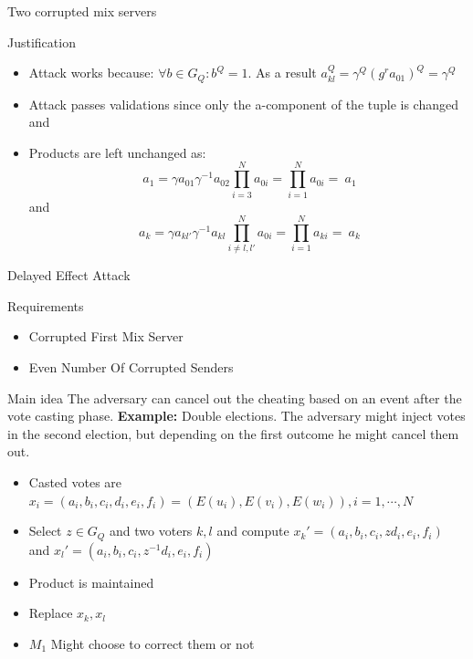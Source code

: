 \documentclass{beamer}
\begin{document}
\begin{frame}[allowframebreaks]{Two corrupted mix servers}
\begin{block}{Justification}
\begin{itemize}
\item Attack works because: $\forall b \in G_Q : b^Q = 1$. As a result $a_{kl}^Q = \gamma ^ Q (g^r a_{01})^Q = \gamma ^ Q$
\item Attack passes validations since only the a-component of the tuple is changed and  
\item Products are left unchanged as:
\[ \ a_{1}  = \gamma a_{01} \gamma^{-1} a_{02} \prod_{i=3}^N a_{0i} = \prod_{i=1}^N a_{0i} = \ a_{1} \] and
\[ \ a_{k}  = \gamma a_{kl'} \gamma^{-1} a_{kl} \prod_{i \neq l,l'}^N a_{0i} = \prod_{i=1}^N a_{ki} = \ a_{k} \]
\end{itemize}
\end{block}

\end{frame}

\begin{frame}[allowframebreaks]{Delayed Effect Attack}
\begin{block}{Requirements}
\begin{itemize}
\item Corrupted First Mix Server
\item Even Number Of Corrupted Senders
\end{itemize}
\end{block}

\begin{block}{Main idea}
The adversary can cancel out the cheating based on an event after the vote casting phase.
\textbf{Example:} Double elections. The adversary might inject votes in the second election, but depending on the first outcome he might cancel them out.
\end{block}

\begin{itemize}
\item Casted votes are $ x_i = (a_i,b_i,c_i,d_i,e_i,f_i) = (E(u_i),E(v_i),E(w_i)), i=1,\cdots,N $
\item Select $z \in G_Q$ and two voters $k,l$ and compute  $x_k' = (a_i,b_i,c_i,zd_i,e_i,f_i) $ and $x_l' = (a_i,b_i,c_i,z^{-1}d_i,e_i,f_i) $
\item Product is maintained
\item Replace $x_k, x_l$
\item $M_1$ Might choose to correct them or not
\end{itemize}

\end{frame}
\end{document}
